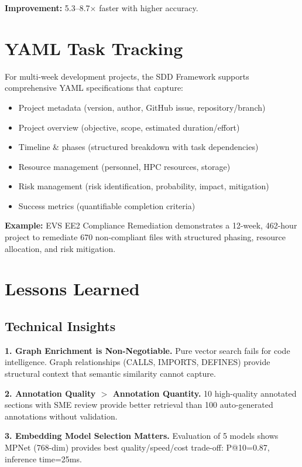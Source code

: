 \documentclass[11pt,letterpaper]{article}
\begin{document}
\textbf{Improvement:} 5.3--8.7$\times$ faster with higher accuracy.

\section{YAML Task Tracking}
\label{sec:yaml}

For multi-week development projects, the SDD Framework supports comprehensive YAML specifications that capture:

\begin{itemize}
    \item Project metadata (version, author, GitHub issue, repository/branch)
    \item Project overview (objective, scope, estimated duration/effort)
    \item Timeline \& phases (structured breakdown with task dependencies)
    \item Resource management (personnel, HPC resources, storage)
    \item Risk management (risk identification, probability, impact, mitigation)
    \item Success metrics (quantifiable completion criteria)
\end{itemize}

\textbf{Example:} EVS EE2 Compliance Remediation demonstrates a 12-week, 462-hour project to remediate 670 non-compliant files with structured phasing, resource allocation, and risk mitigation.

\section{Lessons Learned}

\subsection{Technical Insights}

\textbf{1. Graph Enrichment is Non-Negotiable.} Pure vector search fails for code intelligence. Graph relationships (CALLS, IMPORTS, DEFINES) provide structural context that semantic similarity cannot capture.

\textbf{2. Annotation Quality $>$ Annotation Quantity.} 10 high-quality annotated sections with SME review provide better retrieval than 100 auto-generated annotations without validation.

\textbf{3. Embedding Model Selection Matters.} Evaluation of 5 models shows MPNet (768-dim) provides best quality/speed/cost trade-off: P@10=0.87, inference time=25ms.
\end{document}
